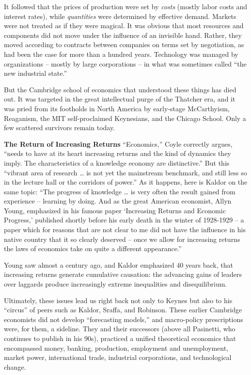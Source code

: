 \documentclass[
]{book}
\begin{document}
It followed that the prices of production were set by \emph{costs} (mostly labor costs and interest rates), while \emph{quantities} were determined by effective demand. Markets were not treated as if they were magical. It was obvious that most resources and components did not move under the influence of an invisible hand. Rather, they moved according to contracts between companies on terms set by negotiation, as had been the case for more than a hundred years. Technology was managed by organizations -- mostly by large corporations -- in what was sometimes called ``the new industrial state.''

But the Cambridge school of economics that understood these things has died out. It was targeted in the great intellectual purge of the Thatcher era, and it was pried from its footholds in North America by early-stage McCarthyism, Reaganism, the MIT self-proclaimed Keynesians, and the Chicago School. Only a few scattered survivors remain today.

\textbf{The Return of Increasing Returns}
``Economics,'' Coyle correctly argues, ``needs to have at its heart increasing returns and the kind of dynamics they imply. The characteristics of a knowledge economy are distinctive.'' But this ``vibrant area of research \ldots{} is not yet the mainstream benchmark, and still less so in the lecture hall or the corridors of power.'' As it happens, here is Kaldor on the same topic: ``The progress of knowledge \ldots{} is very often the result gained from experience -- learning by doing. And as the great American economist, Allyn Young, emphasized in his famous paper `Increasing Returns and Economic Progress,' published shortly before his early death in the winter of 1928-1929 -- a paper which for reasons that are not clear to me did not have the influence in his native country that it so clearly deserved -- once we allow for increasing returns the laws of economics take on quite a different appearance.''

Young saw almost a century ago, and Kaldor emphasized 40 years back, that increasing returns generate cumulative causation: the advancing gains of leaders over laggards produce increasingly extreme inequalities and disequilibrium.

Ultimately, these issues lead us right back not only to Keynes but also to his ``circus'' of peers such as Kaldor, Sraffa, and Robinson. These earlier Cambridge economists did not develop ``forecasting models,'' and macro-policy prescriptions were, for them, a sideline. They and their successors (above all Pasinetti, who continues to publish in his 90s), practiced a unified theoretical economics that encompassed money, banking, production, employment and unemployment, market power, international trade, industrial corporations, and technological change.
\end{document}
